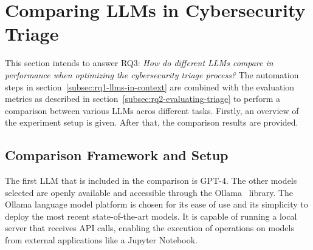 \section{Comparing LLMs in Cybersecurity Triage}
\label{sec:rq3}

This section intends to answer RQ3:
\textit{How do different LLMs compare in performance when optimizing the cybersecurity triage process?}
The automation steps in section\ \ref{subsec:rq1-llms-in-context} are combined with the evaluation metrics as described
in section\ \ref{subsec:rq2-evaluating-triage} to perform a comparison between various LLMs acros different tasks.
Firstly, an overview of the experiment setup is given.
After that, the comparison results are provided.

\subsection{Comparison Framework and Setup}
\label{subsec:rq3-comparison-framework}

The first LLM that is included in the comparison is GPT-4.
The other models selected are openly available and accessible through the Ollama\ \citep{ollama} library.
The Ollama language model platform is chosen for its ease of use and its simplicity to deploy the most recent
state-of-the-art models.
It is capable of running a local server that receives API calls, enabling the execution of operations on models from
external applications like a Jupyter Notebook.

